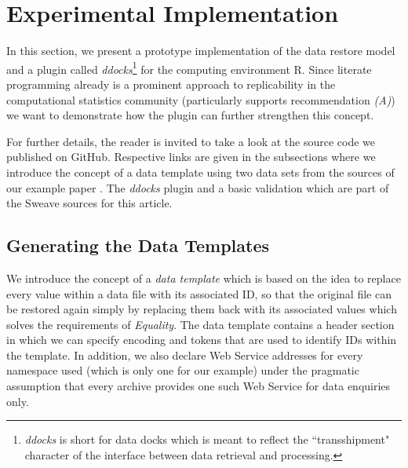 \documentclass{acm_proc_article-sp}
\begin{document}
\section{Experimental Implementation}\label{sec:impl}

In this section, we present a prototype implementation of the data restore model and a plugin called \textit{ddocks}\footnote{\textit{ddocks} is short for data docks which is meant to reflect the ``transshipment" character of the interface between data retrieval and processing.} 
for the computing environment R.
Since literate programming already is a prominent approach to replicability in the computational statistics community \cite{leisch2011executable} (particularly supports recommendation \textit{(A)}) we want to demonstrate how the plugin can further strengthen this concept.


For further details, the reader is invited to take a look at the source code we published on GitHub.
Respective links are given in the subsections
where we introduce the concept of a data template using two data sets from the sources of our example paper \cite{KoenkerZeileis2009}. 
The \textit{ddocks} plugin and a basic validation which are part of the Sweave sources for this article.


\subsection{Generating the Data Templates}


We introduce the concept of a \textit{data template} which is based on the idea to replace every value within a data file with its associated ID, so that the original file can be restored again simply by replacing them back with its associated values which solves the requirements of \textit{Equality}.
The data template contains a header section in which we can specify encoding and tokens that are used to identify IDs within the template.
In addition, we also declare Web Service addresses for every namespace used (which is only one for our example) under the pragmatic assumption that every archive provides one such Web Service for data enquiries only.
\end{document}
